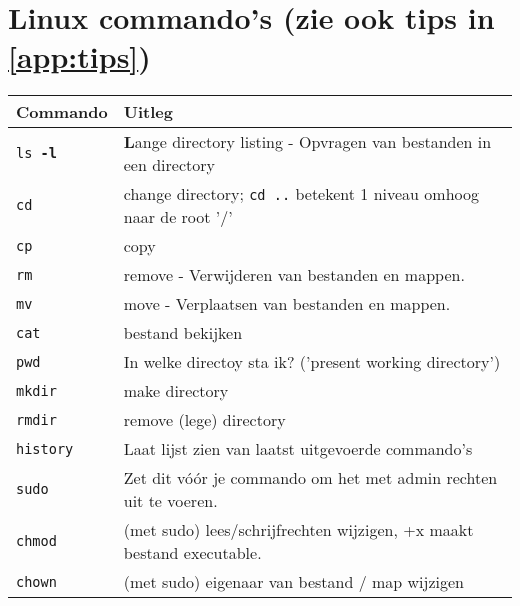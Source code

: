 \break
\section{Linux commando's (zie ook tips in \ref{app:tips})}\label{app:commands}

\begin{table}[ht] %
	\begin{tabular}{|l|l|}
		\hline
		Commando & Uitleg \\ \hline
		\texttt{ls \textbf{-l}} & \textbf{L}ange directory listing - Opvragen van bestanden in een directory  \\ \hline
		\texttt{cd} & change directory; \texttt{cd ..} betekent 1 niveau omhoog naar de root '/' \\ \hline
	    \texttt{cp} & copy \\ \hline
	    \texttt{rm} & remove - Verwijderen van bestanden en mappen. \\ \hline
	    \texttt{mv} & move - Verplaatsen van bestanden en mappen. \\ \hline
	    \texttt{cat} & bestand bekijken \\ \hline
	    \texttt{pwd} & In welke directoy sta ik? ('present working directory') \\ \hline
	    \texttt{mkdir} & make directory \\ \hline
		\texttt{rmdir} & remove (lege) directory \\ \hline
	    \texttt{history} & Laat lijst zien van laatst uitgevoerde commando's \\ \hline
	    \texttt{sudo} & Zet dit vóór je commando om het met admin rechten uit te voeren. \\ \hline
	    \texttt{chmod} & (met sudo) lees/schrijfrechten wijzigen, +x maakt bestand executable. \\ \hline
	    \texttt{chown} & (met sudo) eigenaar van bestand / map wijzigen \\ \hline
	\end{tabular}
\end{table}

\break
